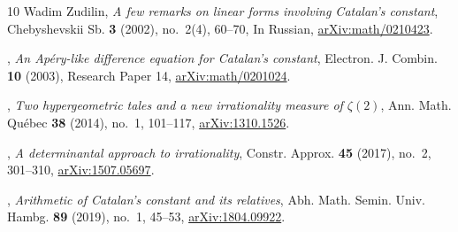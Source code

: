\documentclass[11pt]{amsart}
\theoremstyle{definition}
\theoremstyle{remark}
\numberwithin{equation}{section}
\begin{document}
\begin{thebibliography}{10}
Wadim Zudilin, \emph{A few remarks on linear forms involving {C}atalan's
  constant}, Chebyshevskii Sb. \textbf{3} (2002), no.~2(4), 60--70, In Russian,
  \href{https://arxiv.org/abs/math/0210423}{arXiv:math/0210423}.

\bysame, \emph{An {A}p\'ery-like difference equation for {C}atalan's constant},
  Electron. J. Combin. \textbf{10} (2003), Research Paper 14,
  \href{https://arxiv.org/abs/math/0201024}{arXiv:math/0201024}.

\bysame, \emph{Two hypergeometric tales and a new irrationality measure of
  {$\zeta(2)$}}, Ann. Math. Qu\'ebec \textbf{38} (2014), no.~1, 101--117,
  \href{https://arxiv.org/abs/1310.1526}{arXiv:1310.1526}.

\bysame, \emph{A determinantal approach to irrationality}, Constr. Approx.
  \textbf{45} (2017), no.~2, 301--310,
  \href{https://arxiv.org/abs/1507.05697}{arXiv:1507.05697}.

\bysame, \emph{Arithmetic of {C}atalan's constant and its relatives}, Abh.
  Math. Semin. Univ. Hambg. \textbf{89} (2019), no.~1, 45--53,
  \href{https://arxiv.org/abs/1804.09922}{arXiv:1804.09922}.

\end{thebibliography}
\end{document}
